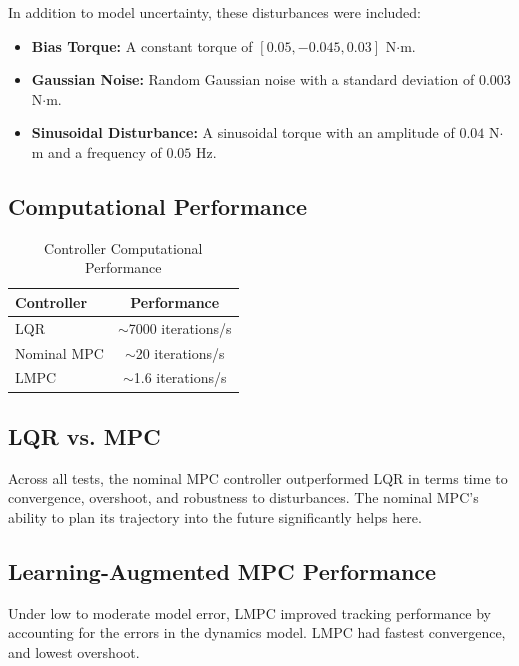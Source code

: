 \documentclass[conference]{IEEEtran}
\begin{document}
In addition to model uncertainty, these disturbances were included:
\begin{itemize}
    \item \textbf{Bias Torque:} A constant torque of
    \( [0.05, -0.045, 0.03] \) N\( \cdot \)m.
    \item \textbf{Gaussian Noise:} Random Gaussian noise with a standard
    deviation of \( 0.003 \) N\( \cdot \)m.
    \item \textbf{Sinusoidal Disturbance:} A sinusoidal torque with an
    amplitude of \( 0.04 \) N\( \cdot \)m and a frequency of \( 0.05 \) Hz.
\end{itemize}

\subsection{Computational Performance}

\begin{table}[htbp]
    \centering
    \caption{Controller Computational Performance}
    \label{tab:computational_performance}
    \begin{tabular}{>{\large}l>{\large}c}
        \toprule
        \textbf{Controller} & \textbf{Performance} \\
        \midrule
        LQR & $\sim$7000 iterations/s \\
        Nominal MPC & $\sim$20 iterations/s \\
        LMPC & $\sim$1.6 iterations/s \\
        \bottomrule
    \end{tabular}
\end{table}

\subsection{LQR vs. MPC}
Across all tests, the nominal MPC controller outperformed LQR in
terms time to convergence, overshoot, and robustness to disturbances. The nominal
MPC's ability to plan its trajectory into the future significantly helps here.

\subsection{Learning-Augmented MPC Performance}
Under low to moderate model error, LMPC improved tracking performance by
accounting for the errors in the dynamics model. LMPC had fastest convergence, 
and lowest overshoot.
\end{document}
